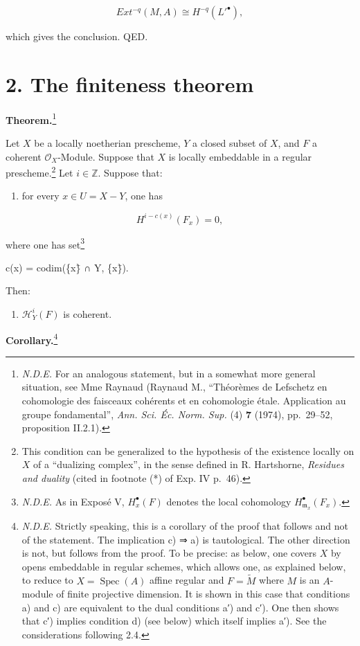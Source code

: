 \documentclass[
  11pt,
  a4paper,
]{book}
\newenvironment{Shaded}{}{}
\newcommand{\NormalTok}[1]{#1}
\providecommand{\tightlist}{%
  \setlength{\itemsep}{0pt}\setlength{\parskip}{0pt}}
\begin{document}
\[ Ext^{-q}(M, A) \cong H^{-q}(L'^{\bullet}), \]

which gives the conclusion. QED.

\section{2. The finiteness theorem}\label{the-finiteness-theorem}

\textbf{Theorem.}\footnote{\emph{N.D.E.} For an analogous statement, but
  in a somewhat more general situation, see Mme Raynaud (Raynaud M.,
  ``Théorèmes de Lefschetz en cohomologie des faisceaux cohérents et en
  cohomologie étale. Application au groupe fondamental'', \emph{Ann.
  Sci. Éc. Norm. Sup.} (4) \textbf{7} (1974), pp.~29--52, proposition
  II.2.1).}

Let \(X\) be a locally noetherian prescheme, \(Y\) a closed subset of
\(X\), and \(F\) a coherent \(\mathcal{O}_{X}\)-Module. Suppose that
\(X\) is locally embeddable in a regular prescheme.\footnote{This
  condition can be generalized to the hypothesis of the existence
  locally on \(X\) of a ``dualizing complex'', in the sense defined in
  R. Hartshorne, \emph{Residues and duality} (cited in footnote (*) of
  Exp. IV p.~46).} Let \(i \in \mathbb{Z}\). Suppose that:

\begin{enumerate}
\def\labelenumi{\alph{enumi})}
\tightlist
\item
  for every \(x \in U = X - Y\), one has
\end{enumerate}

\[ H^{i-c(x)}(F_{x}) = 0, \]

where one has set\footnote{\emph{N.D.E.} As in Exposé V,
  \(H^{\bullet}_{x}(F)\) denotes the local cohomology
  \(H^{\bullet}_{\mathfrak{m}_{x}}(F_{x})\).}

\begin{Shaded}
\begin{Highlighting}[]
\NormalTok{c(x) = codim(\{x\}̄ ∩ Y, \{x\}̄).}
\end{Highlighting}
\end{Shaded}

Then:

\begin{enumerate}
\def\labelenumi{\alph{enumi})}
\setcounter{enumi}{1}
\tightlist
\item
  \(\mathcal{H}^{i}_{Y}(F)\) is coherent.
\end{enumerate}

\textbf{Corollary.}\footnote{\emph{N.D.E.} Strictly speaking, this is a
  corollary of the proof that follows and not of the statement. The
  implication c) ⇒ a) is tautological. The other direction is not, but
  follows from the proof. To be precise: as below, one covers \(X\) by
  opens embeddable in regular schemes, which allows one, as explained
  below, to reduce to \(X
  = \operatorname{Spec}(A)\) affine regular and \(F = \tilde{M}\) where
  \(M\) is an \(A\)-module of finite projective dimension. It is shown
  in this case that conditions a) and c) are equivalent to the dual
  conditions a′) and c′). One then shows that c′) implies condition d)
  (see below) which itself implies a′). See the considerations following
  2.4.}
\end{document}
